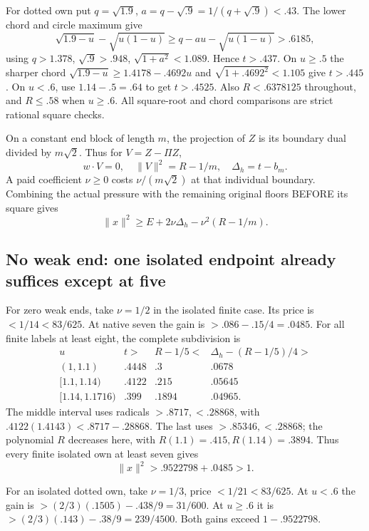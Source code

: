 \documentclass[11pt]{article}
\theoremstyle{definition}
\theoremstyle{remark}
\begin{document}
For dotted own put \(q=\sqrt{1.9}\),
\(a=q-\sqrt{.9}=1/(q+\sqrt{.9})<.43\).
The lower chord and circle maximum
give
\[
 \sqrt{1.9-u}-\sqrt{u(1-u)}
       \ge q-au-\sqrt{u(1-u)}>.6185,
\]
using \(q>1.378\), \(\sqrt{.9}>.948\),
\(\sqrt{1+a^2}<1.089\).
Hence \(t>.437\).
On \(u\ge.5\) the sharper chord
\(\sqrt{1.9-u}\ge1.4178-.4692u\)
and \(\sqrt{1+.4692^2}<1.105\)
give \(t>.445\).
On \(u<.6\), use \(1.14-.5=.64\)
to get \(t>.4525\).
Also \(R<.6378125\) throughout,
and \(R\le.58\) when \(u\ge.6\).
All square-root and chord comparisons
are strict rational square checks.

On a constant end block of length
\(m\), the projection of \(Z\) is
its boundary dual divided by
\(m\sqrt2\).
Thus for \(V=Z-\Pi Z\),
\[
 w\cdot V=0,\quad \|V\|^2=R-1/m,\quad
                         \Delta_h=t-b_m .
\]
A paid coefficient \(\nu\ge0\)
costs \(\nu/(m\sqrt2)\) at that
individual boundary.
Combining the actual pressure with
the remaining original floors
BEFORE its square gives
\[
                 \|x\|^2\ge E+2\nu\Delta_h-\nu^2(R-1/m).
\tag{A19endpay}\label{app:exact19:eq:Aendpay}
\]

\subsection{No weak end: one isolated endpoint already suffices except at five}
\label{app:exact19:Azeroweak}

For zero weak ends, take \(\nu=1/2\)
in the isolated finite case.
Its price is \(<1/14<83/625\).
At native seven the gain is
\(>.086-.15/4=.0485\).
For all finite labels at least eight,
the complete subdivision is
\[
\begin{array}{c|c|c|c}
 u&t>&R-1/5<&\Delta_h-(R-1/5)/4>\\ \hline
 (1,1.1)&.4448&.3&.0678\\
 {}[1.1,1.14)&.4122&.215&.05645\\
 {}[1.14,1.1716)&.399&.1894&.04965 .
\end{array}
\]
The middle interval uses radicals
\(>.8717,<.28868\), with
\(.4122(1.4143)<.8717-.28868\).
The last uses \(>.85346,<.28868\);
the polynomial \(R\) decreases here,
with \(R(1.1)=.415,R(1.14)=.3894\).
Thus every finite isolated own
at least seven gives
\[
                         \|x\|^2>.9522798+.0485>1 .
\]

For an isolated dotted own, take
\(\nu=1/3\), price
\(<1/21<83/625\).
At \(u<.6\) the gain is
\(>(2/3)(.1505)-.438/9=31/600\).
At \(u\ge.6\) it is
\(>(2/3)(.143)-.38/9=239/4500\).
Both gains exceed \(1-.9522798\).
\end{document}
